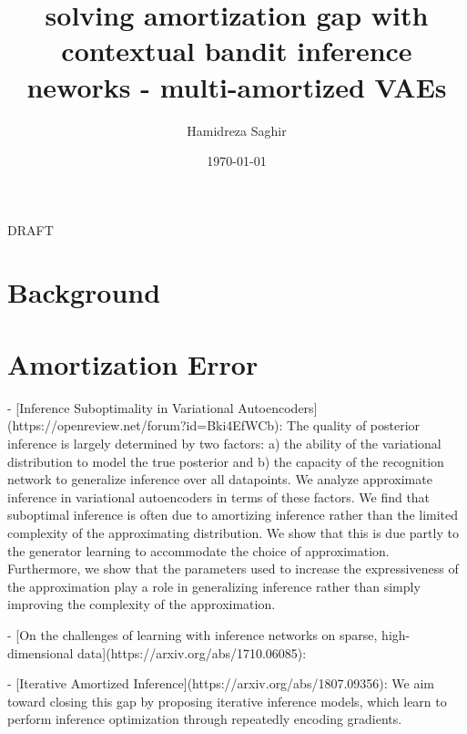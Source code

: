 \documentclass[aps,preprint,showpacs,superscriptaddress,groupedaddress]{revtex4}  %
\begin{document}
\hspace{5.2in} \mbox{DRAFT}

\title{solving amortization gap with contextual bandit inference neworks - multi-amortized VAEs}

\author{Hamidreza Saghir}



\date{\today}

\begin{abstract}

\end{abstract}


\maketitle

\section{\label{sec1}Background}


\section{Amortization Error}


- [Inference Suboptimality in Variational Autoencoders](https://openreview.net/forum?id=Bki4EfWCb): The quality of posterior inference is largely determined by two factors: a) the ability of the variational distribution to model the true posterior and b) the capacity of the recognition network to generalize inference over all datapoints. We analyze approximate inference in variational autoencoders in terms of these factors. We find that suboptimal inference is often due to amortizing inference rather than the limited complexity of the approximating distribution. We show that this is due partly to the generator learning to accommodate the choice of approximation. Furthermore, we show that the parameters used to increase the expressiveness of the approximation play a role in generalizing inference rather than simply improving the complexity of the approximation.

- [On the challenges of learning with inference networks on sparse, high-dimensional data](https://arxiv.org/abs/1710.06085):

- [Iterative Amortized Inference](https://arxiv.org/abs/1807.09356): We aim toward closing this gap by proposing iterative inference models, which learn to perform inference optimization through repeatedly encoding gradients.
\end{document}
